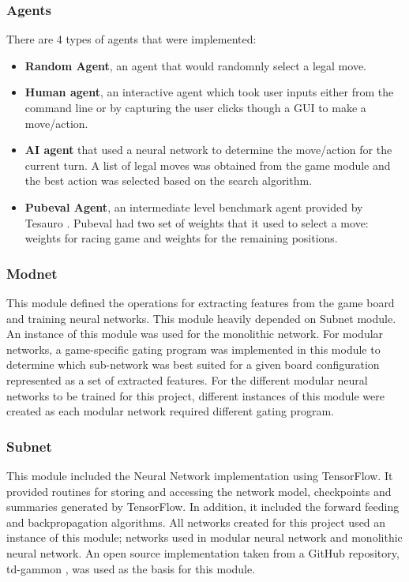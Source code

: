 \documentclass[12pt,a4paper]{article}
\begin{document}
\subsubsection{Agents}
There are 4 types of agents that were implemented: 
\begin{itemize}
    \item \textbf{Random Agent}, an agent that would randomnly select a legal move.
    \item \textbf{Human agent}, an interactive agent which took user inputs either from the command line or by capturing the user clicks though a GUI to make a move/action.
    \item \textbf{AI agent} that used a neural network to determine the move/action for the current turn. A list of legal moves was obtained from the game module and the best action was selected based on the search algorithm.
    \item \textbf{Pubeval Agent}, an intermediate level benchmark agent provided by Tesauro \citeyear{pubeval}. Pubeval had two set of weights that it used to select a move: weights for racing game and weights for the remaining positions. 
\end{itemize}

\subsubsection{Modnet}
This module defined the operations for extracting features from the game board and training neural networks. This module heavily depended on Subnet module. An instance of this module was used for the monolithic network. For modular networks, a game-specific gating program was implemented in this module to determine which sub-network was best suited for a given board configuration represented as a set of extracted features. For the different modular neural networks to be trained for this project, different instances of this module were created as each modular network required different gating program.

\subsubsection{Subnet}
This module included the Neural Network implementation using TensorFlow. It provided routines for storing and accessing the network model, checkpoints and summaries generated by TensorFlow. In addition, it included the forward feeding and backpropagation algorithms. All networks created for this project used an instance of this module; networks used in modular neural network and monolithic neural network. An open source implementation taken from a GitHub repository, td-gammon \cite{fomorians}, was used as the basis for this module. 
\end{document}
